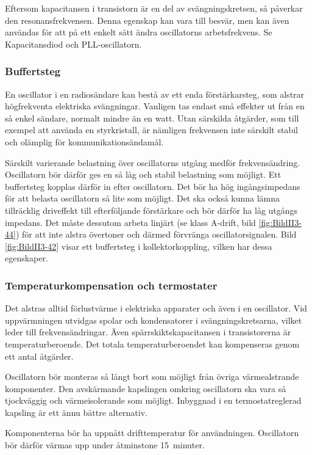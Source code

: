 Eftersom kapacitansen i transistorn är en del av svängningskretsen, så påverkar
den resonansfrekvensen.
Denna egenskap kan vara till besvär, men kan även användas för att på ett
enkelt sätt ändra oscillatorns arbetsfrekvens.
Se Kapacitansdiod och PLL-oscillatorn.

\subsubsection{Buffertsteg}

En oscillator i en radiosändare kan bestå av ett enda förstärkarsteg,
som alstrar högfrekventa elektriska svängningar.
Vanligen tas endast små effekter ut från en så enkel sändare, normalt mindre än
en watt.
Utan särskilda åtgärder, som till exempel att använda en styrkristall, är nämligen
frekvensen inte särskilt stabil och olämplig för kommunikationsändamål.

Särskilt varierande belastning över oscillatorns utgång medför frekvensändring.
Oscillatorn bör därför ges en så låg och stabil belastning som möjligt.
Ett buffertsteg kopplas därför in efter oscillatorn.
Det bör ha hög ingångsimpedans för att belasta oscillatorn så lite som möjligt.
Det ska också kunna lämna tillräcklig driveffekt till efterföljande förstärkare
och bör därför ha låg utgångs impedans.
Det måste dessutom arbeta linjärt (se klass A-drift, bild \ref{fig:BildII3-44})
för att inte alstra övertoner och därmed förvränga oscillatorsignalen.
Bild \ref{fig:BildII3-42} visar ett buffertsteg i kollektorkoppling, vilken har
dessa egenskaper.

\subsubsection{Temperaturkompensation och termostater}

Det alstras alltid förlustvärme i elektriska apparater och även i en
oscillator.
Vid uppvärmningen utvidgas spolar och kondensatorer i svängningskretsarna,
vilket leder till frekvensändringar.
Även spärrskiktskapacitansen i transistorerna är temperaturberoende.
Det totala temperaturberoendet kan kompenseras genom ett antal åtgärder.

Oscillatorn bör monteras så långt bort som möjligt från övriga
värmealstrande komponenter.
Den avskärmande kapslingen omkring oscillatorn ska vara så tjockväggig och
värmeisolerande som möjligt.
Inbyggnad i en termostatreglerad kapsling är ett ännu bättre alternativ.

Komponenterna bör ha uppnått drifttemperatur för användningen.
Oscillatorn bör därför värmas upp under åtminstone 15~minuter.

